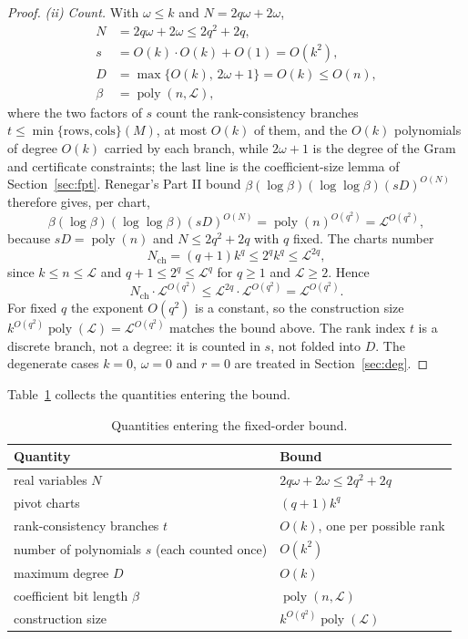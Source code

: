 \documentclass[journal]{IEEEtran}
\theoremstyle{plainn}
\theoremstyle{remark}
\begin{document}
\begin{proof}
\emph{(ii) Count.} With $\omega\le k$ and $N=2q\omega+2\omega$,
\begin{align}
N &= 2q\omega+2\omega\le 2q^2+2q,\\
s &= O(k)\cdot O(k)+O(1)=O(k^2),\\
D &= \max\{O(k),\,2\omega+1\}=O(k)\le O(n),\\
\beta &= \operatorname{poly}(n,\mathcal L),
\end{align}
where the two factors of $s$ count the rank-consistency branches
$t\le\min\{\text{rows},\text{cols}\}(M)$, at most $O(k)$ of them, and the
$O(k)$ polynomials of degree $O(k)$ carried by each branch, while $2\omega+1$
is the degree of the Gram and certificate constraints; the last line is the
coefficient-size lemma of Section~\ref{sec:fpt}. Renegar's Part II bound
$\beta(\log\beta)(\log\log\beta)(sD)^{O(N)}$ therefore gives, per chart,
\[
\beta(\log \beta)(\log\log \beta)(sD)^{O(N)}
=\operatorname{poly}(n)^{O(q^2)}
=\mathcal L^{O(q^2)},
\]
because $sD=\operatorname{poly}(n)$ and $N\le 2q^2+2q$ with $q$ fixed. The
charts number
\[
N_{\mathrm{ch}}=(q+1)k^{q}\le 2^{q}k^{q}\le\mathcal L^{2q},
\]
since $k\le n\le\mathcal L$ and $q+1\le 2^{q}\le\mathcal L^{q}$ for $q\ge1$
and $\mathcal L\ge2$. Hence
\[
N_{\mathrm{ch}}\cdot\mathcal L^{O(q^2)}
\le\mathcal L^{2q}\cdot\mathcal L^{O(q^2)}
=\mathcal L^{O(q^2)} .
\]
For fixed $q$ the exponent $O(q^2)$ is a constant, so the construction size
$k^{O(q^2)}\operatorname{poly}(\mathcal L)=\mathcal L^{O(q^2)}$ matches the bound above. The rank index $t$ is a discrete branch, not a
degree: it is counted in $s$, not folded into $D$. The degenerate cases $k=0$,
$\omega=0$ and $r=0$ are treated in Section~\ref{sec:deg}.
\end{proof}

Table~\ref{tab:4} collects the quantities entering the bound.

\begin{table}[!t]
\centering
\caption{Quantities entering the fixed-order bound.}\label{tab:4}
\small
\begin{tabular}{p{}p{}}
\toprule
Quantity & Bound \\
\midrule
real variables $N$ & $2q\omega+2\omega\le2q^2+2q$ \\
pivot charts & $(q+1)k^q$ \\
rank-consistency branches $t$ & $O(k)$, one per possible rank \\
number of polynomials $s$ (each counted once) & $O(k^2)$ \\
maximum degree $D$ & $O(k)$ \\
coefficient bit length $\beta$ & $\operatorname{poly}(n,\mathcal L)$ \\
construction size & $k^{O(q^2)}\operatorname{poly}(\mathcal L)$ \\
\bottomrule
\end{tabular}
\end{table}
\end{document}
